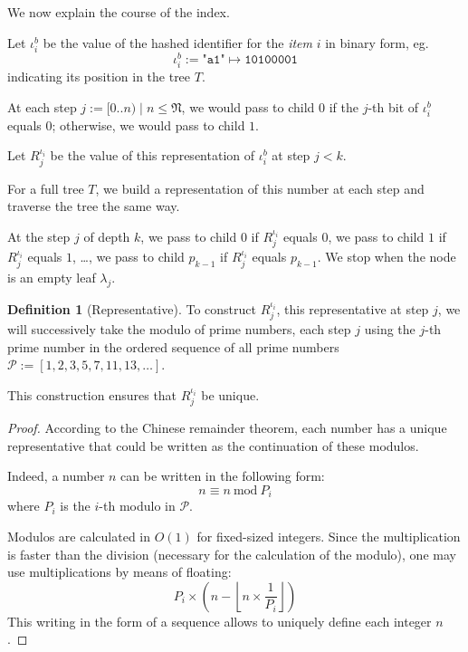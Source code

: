 \documentclass[twoside,twocolumn]{article}
\newcommand{\floor}[1]{\left\lfloor #1 \right\rfloor}
\newcommand{\mod}[1]{\ \mathrm{mod}\ #1}
\theoremstyle{definition}
\newtheorem{definition}{Definition}
\theoremstyle{remark}
\begin{document}
We now explain the course of the index.

Let $\iota_i^b$ be the value of the hashed identifier for the \emph{item} $i$ in binary form, eg. $$
    \iota_i^b := \texttt{"a1"} \mapsto \texttt{10100001}
$$
indicating its position in the tree $T$.

At each step $j := [0..n) \mid n \leq \mathfrak{N}$, we would pass to child $0$ if the $j$-th bit of $\iota_i^b$ equals $0$; otherwise, we would 
pass to child $1$.

Let $R_j^{\iota_i}$ be the value of this representation of $\iota_i^b$ at step $j < k$.

For a full tree $T$, we build a representation of this number at each step and traverse the tree the same way. 

At the step $j$ of depth $k$, we pass to child $0$ if $R_j^{\iota_i}$ equals $0$, we pass to child $1$ if $R_j^{\iota_i}$ equals $1$, \dots, we 
pass to child $p_{k-1}$ if $R_j^{\iota_i}$ equals $p_{k-1}$.
We stop when the node is an empty leaf $\lambda_j$.

\begin{definition}[Representative]
    \label{representative}
    To construct $R_j^{\iota_i}$, this representative at step $j$, we will successively take the modulo of prime numbers, each step $j$ using the 
    $j$-th prime number in the ordered sequence of all prime numbers $\mathcal{P} := [1, 2, 3, 5, 7, 11, 13, \dots]$.

    This construction ensures that $R_j^{\iota_i}$ be unique.

    \begin{proof}
        According to the Chinese remainder theorem\cite{gauss}, each number has a unique representative that could be written as the continuation 
        of these modulos.

        Indeed, a number $n$ can be written in the following form:$$
            n \equiv n \mod P_i
        $$
        where $P_i$ is the $i$-th modulo in $\mathcal{P}$.

        Modulos are calculated in $O(1)$ for fixed-sized integers.
        Since the multiplication is faster than the division (necessary for the calculation of the modulo), one may use 
        multiplications by means of floating:$$
            P_i \times \left( n - \floor{n \times \frac{1}{P_i}} \right)
        $$
        This writing in the form of a sequence allows to uniquely define each integer $n$.
    \end{proof}
\end{definition}
\end{document}
